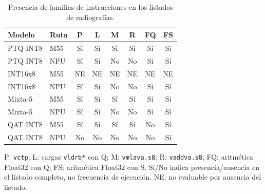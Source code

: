 \begin{table}[H]\centering\small
\caption{Presencia de familias de instrucciones en los listados de radiografías.}\label{tab:helium_rx}
\begin{tabularx}{\linewidth}{Xlcccccc}\toprule
Modelo & Ruta & P & L & M & R & FQ & FS\\\midrule
PTQ INT8 & M55 & Sí & Sí & Sí & Sí & Sí & Sí\\
PTQ INT8 & NPU & Sí & Sí & No & No & Sí & Sí\\
INT16x8 & M55 & NE & NE & NE & NE & NE & NE\\
INT16x8 & NPU & Sí & Sí & No & No & Sí & Sí\\
Mixta-5 & M55 & Sí & Sí & Sí & Sí & Sí & Sí\\
Mixta-5 & NPU & Sí & Sí & No & No & Sí & Sí\\
QAT INT8 & M55 & Sí & Sí & Sí & Sí & No & Sí\\
QAT INT8 & NPU & No & No & No & No & No & Sí\\
\bottomrule\end{tabularx}
\par\smallskip\begin{minipage}{\linewidth}\footnotesize P: \texttt{vctp}; L: cargas \texttt{vldrb*} con Q; M: \texttt{vmlava.s8}; R: \texttt{vaddva.s8}; FQ: aritmética Float32 con Q; FS: aritmética Float32 con S. Sí/No indica presencia/ausencia en el listado completo, no frecuencia de ejecución. NE: no evaluable por ausencia del listado.\end{minipage}
\end{table}
